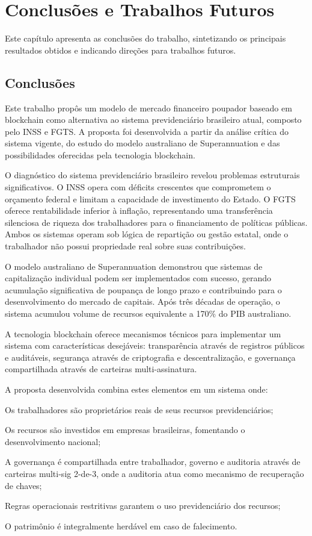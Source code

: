 \chapter{Conclusões e Trabalhos Futuros}
\label{cap:conclusao}

Este capítulo apresenta as conclusões do trabalho, sintetizando os principais resultados obtidos e indicando direções para trabalhos futuros.

\section{Conclusões}

Este trabalho propôs um modelo de mercado financeiro poupador baseado em blockchain como alternativa ao sistema previdenciário brasileiro atual, composto pelo INSS e FGTS. A proposta foi desenvolvida a partir da análise crítica do sistema vigente, do estudo do modelo australiano de Superannuation e das possibilidades oferecidas pela tecnologia blockchain.

O diagnóstico do sistema previdenciário brasileiro revelou problemas estruturais significativos. O INSS opera com déficits crescentes que comprometem o orçamento federal e limitam a capacidade de investimento do Estado. O FGTS oferece rentabilidade inferior à inflação, representando uma transferência silenciosa de riqueza dos trabalhadores para o financiamento de políticas públicas. Ambos os sistemas operam sob lógica de repartição ou gestão estatal, onde o trabalhador não possui propriedade real sobre suas contribuições.

O modelo australiano de Superannuation demonstrou que sistemas de capitalização individual podem ser implementados com sucesso, gerando acumulação significativa de poupança de longo prazo e contribuindo para o desenvolvimento do mercado de capitais. Após três décadas de operação, o sistema acumulou volume de recursos equivalente a 170\% do PIB australiano.

A tecnologia blockchain oferece mecanismos técnicos para implementar um sistema com características desejáveis: transparência através de registros públicos e auditáveis, segurança através de criptografia e descentralização, e governança compartilhada através de carteiras multi-assinatura.

A proposta desenvolvida combina estes elementos em um sistema onde:

\begin{alineas}
    \item Os trabalhadores são proprietários reais de seus recursos previdenciários;
    \item Os recursos são investidos em empresas brasileiras, fomentando o desenvolvimento nacional;
    \item A governança é compartilhada entre trabalhador, governo e auditoria através de carteiras multi-sig 2-de-3, onde a auditoria atua como mecanismo de recuperação de chaves;
    \item Regras operacionais restritivas garantem o uso previdenciário dos recursos;
    \item O patrimônio é integralmente herdável em caso de falecimento.
\end{alineas}

